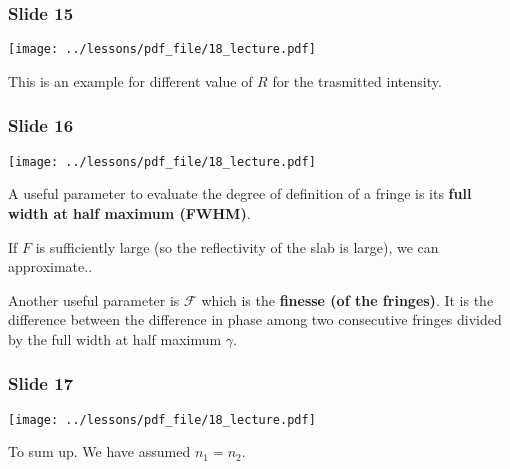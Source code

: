 \documentclass[../main/main.tex]{subfiles}
\begin{document}
\subsubsection*{Slide 15}

\begin{minipage}[]{0.5\linewidth}
\centering
\texttt{[image: ../lessons/pdf\_file/18\_lecture.pdf]}
\end{minipage}
\hspace{0.3cm}\vspace{0.3cm}
\begin{minipage}[c]{0.47\linewidth}

This is an example for different value of \( R \) for the trasmitted intensity.

\end{minipage}

\subsubsection*{Slide 16}

\begin{minipage}[]{0.5\linewidth}
\centering
\texttt{[image: ../lessons/pdf\_file/18\_lecture.pdf]}
\end{minipage}
\hspace{0.3cm}\vspace{0.3cm}
\begin{minipage}[c]{0.47\linewidth}

A useful parameter to evaluate the degree of definition of a fringe is its \textbf{full width at half maximum (FWHM)}.

If \( F \) is sufficiently large (so the reflectivity of the slab is large), we can approximate..

Another useful parameter is \( \mathcal{F} \) which is the \textbf{finesse (of the fringes)}.
It is the difference between the difference in phase among two consecutive fringes divided by the full width at half maximum \( \gamma   \).

\end{minipage}

\subsubsection*{Slide 17}

\begin{minipage}[]{0.5\linewidth}
\centering
\texttt{[image: ../lessons/pdf\_file/18\_lecture.pdf]}
\end{minipage}
\hspace{0.3cm}\vspace{0.3cm}
\begin{minipage}[c]{0.47\linewidth}

To sum up. We have assumed \( n_1 = n_2 \).

\end{minipage}
\end{document}
